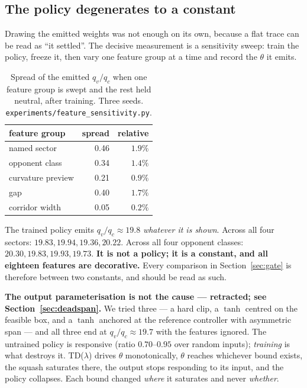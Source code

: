 \documentclass[letterpaper, 10 pt, conference]{ieeeconf}
\begin{document}
\subsection{The policy degenerates to a constant}\label{sec:degenerate}
Drawing the emitted weights was not enough on its own, because a flat trace can
be read as ``it settled''. The decisive measurement is a sensitivity sweep:
train the policy, freeze it, then vary one feature group at a time and record
the $\theta$ it emits.

\begin{table}[t]
  \centering
  \caption{Spread of the emitted $q_v/q_c$ when one feature group is swept and
  the rest held neutral, after training. Three seeds.
  \texttt{experiments/feature\_sensitivity.py}.}
  \label{tab:sens}
  \begin{tabular}{lrr}
    \toprule
    feature group & spread & relative \\
    \midrule
    named sector      & 0.46 & $1.9\%$ \\
    opponent class    & 0.34 & $1.4\%$ \\
    curvature preview & 0.21 & $0.9\%$ \\
    gap               & 0.40 & $1.7\%$ \\
    corridor width    & 0.05 & $0.2\%$ \\
    \bottomrule
  \end{tabular}
\end{table}

The trained policy emits $q_v/q_c \approx 19.8$ \emph{whatever it is shown}.
Across all four sectors: $19.83, 19.94, 19.36, 20.22$. Across all four opponent
classes: $20.30, 19.83, 19.93, 19.73$. \textbf{It is not a policy; it is a
constant, and all eighteen features are decorative.} Every comparison in
Section~\ref{sec:gate} is therefore between two constants, and should be read
as such.

\textbf{The output parameterisation is not the cause --- retracted; see
Section~\ref{sec:deadspan}.} We tried three --- a hard clip, a $\tanh$ centred
on the feasible box, and a $\tanh$ anchored at the reference controller with
asymmetric span --- and all three end at $q_v/q_c \approx 19.7$ with the
features ignored. The untrained policy is
responsive (ratio $0.70$--$0.95$ over random inputs); \emph{training} is what
destroys it. TD($\lambda$) drives $\theta$ monotonically, $\theta$ reaches
whichever bound exists, the squash saturates there, the output stops responding
to its input, and the policy collapses. Each bound changed \emph{where} it
saturates and never \emph{whether}.
\end{document}
